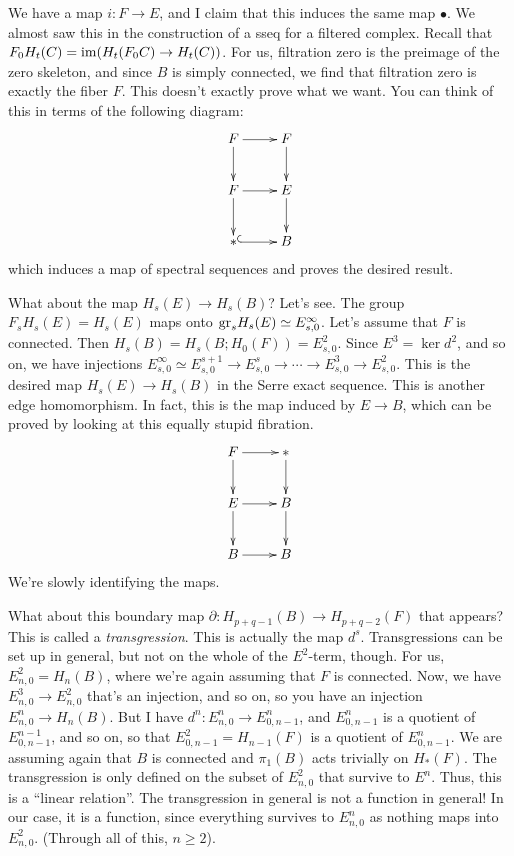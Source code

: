 We have a map $i:F\to E$, and I claim that this induces the same map $\bullet$.
We almost saw this in the construction of a sseq for a filtered complex.
Recall that $F_0H_t(C) = \operatorname{im}(H_t(F_0 C) \to H_t(C))$.
For us, filtration zero is the preimage of the zero skeleton, and since $B$ is simply connected, we find that filtration zero is exactly the fiber $F$.
This doesn't exactly prove what we want.
You can think of this in terms of the following diagram:
\begin{equation*}
    \xymatrix{
	F\ar[r]\ar[d] & F\ar[d]\\
	F\ar[r]\ar[d] & E\ar[d]\\
	\ast\ar@{^(->}[r] & B
    }
\end{equation*}
which induces a map of spectral sequences and proves the desired result.


What about the map $H_s(E)\to H_s(B)$?
Let's see.
The group $F_s H_s(E) = H_s(E)$ maps onto $\mathrm{gr}_s H_s(E) \simeq E^\infty_{s,0}$.
Let's assume that $F$ is connected.
Then $H_s(B) = H_s(B;H_0(F)) = E^2_{s,0}$.
Since $E^3 = \ker d^2$, and so on, we have injections $E^\infty_{s,0} \simeq E^{s+1}_{s,0} \to E^s_{s,0} \to \cdots \to E^3_{s,0} \to E^2_{s,0}$.
This is the desired map $H_s(E) \to H_s(B)$ in the Serre exact sequence.
This is another edge homomorphism.
In fact, this is the map induced by $E\to B$, which can be proved by looking at this equally stupid fibration.
\begin{equation*}
    \xymatrix{
	F\ar[r]\ar[d] & \ast\ar[d]\\
	E\ar[r]\ar[d] & B\ar[d]\\
	B\ar[r] & B
    }
\end{equation*}
We're slowly identifying the maps.

What about this boundary map $\partial:H_{p+q-1}(B)\to H_{p+q-2}(F)$ that appears?
This is called a \emph{transgression}.
This is actually the map $d^s$.
Transgressions can be set up in general, but not on the whole of the $E^2$-term, though.
For us, $E^2_{n,0} = H_n(B)$, where we're again assuming that $F$ is connected.
Now, we have $E^3_{n,0} \to E^2_{n,0}$ that's an injection, and so on, so you have an injection $E^n_{n,0}\to H_n(B)$.
But I have $d^n:E^n_{n,0}\to E^n_{0,n-1}$, and $E^n_{0,n-1}$ is a quotient of $E^{n-1}_{0,n-1}$, and so on, so that $E^2_{0,n-1} = H_{n-1}(F)$ is a quotient of $E^n_{0,n-1}$.
We are assuming again that $B$ is connected and $\pi_1(B)$ acts trivially on $H_\ast(F)$.
The transgression is only defined on the subset of $E^2_{n,0}$ that survive to $E^n$.
Thus, this is a ``linear relation''.
The transgression in general is not a function in general!
In our case, it is a function, since everything survives to $E^n_{n,0}$ as nothing maps into $E^2_{n,0}$.
(Through all of this, $n\geq 2$).

